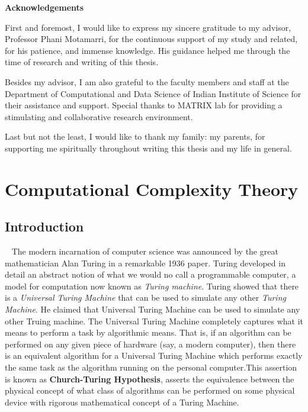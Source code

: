 \documentclass[12pt, oneside]{book}
\theoremstyle{definition}
\theoremstyle{definition}
\theoremstyle{remark}
\newcommand{\acknowledgementsname}{Acknowledgements}
\newenvironment{Acknowledgements}{%
\clearpage
\null\vfill
\begin{center}%
    \bfseries \acknowledgementsname
\end{center}}%
{\vfill\null}
\begin{document}
\begin{Acknowledgements}
First and foremost, I would like to express my sincere gratitude to my advisor,
Professor Phani Motamarri, for the continuous support of my study and related, for
his patience, and immense knowledge.
His guidance helped me through the time of research and writing of this thesis.

Besides my advisor, I am also grateful to the faculty members and staff at the
Department of Computational and Data Science of Indian Institute of Science for
their assistance and support. Special thanks to MATRIX lab for providing a stimulating
and collaborative research environment.

Last but not the least, I would like to thank my family: my parents,
for supporting me spiritually throughout writing this thesis and my life in general.
\end{Acknowledgements}

\tableofcontents

\mainmatter
\chapter{Computational Complexity Theory}
\section{Introduction}
~\cite{cleve2000introduction} The modern incarnation of computer science was announced by the great mathematician Alan Turing in a remarkable 1936 paper. Turing developed in detail an abstract notion of what we would no call a programmable computer, a model for computation now known as \textit{Turing machine}. Turing showed that there is a \textit{Universal Turing Machine} that can be used to simulate any other \textit{Turing Machine}. He claimed that Universal Turing Machine can be used to simulate any other Truing machine. The Universal Turing Machine completely captures what it means to perform a task by algorithmic means. That is, if an algorithm can be performed on any given piece of hardware (say, a modern computer), then there is an equivalent algorithm for a Universal Turing Machine which performs exactly the same task as the algorithm running on the personal computer.This assertion is known as \textbf{Church-Turing Hypothesis}, asserts the equivalence between the physical concept of what class of algorithms can be performed on some physical device with rigorous mathematical concept of a Turing Machine.
\end{document}
